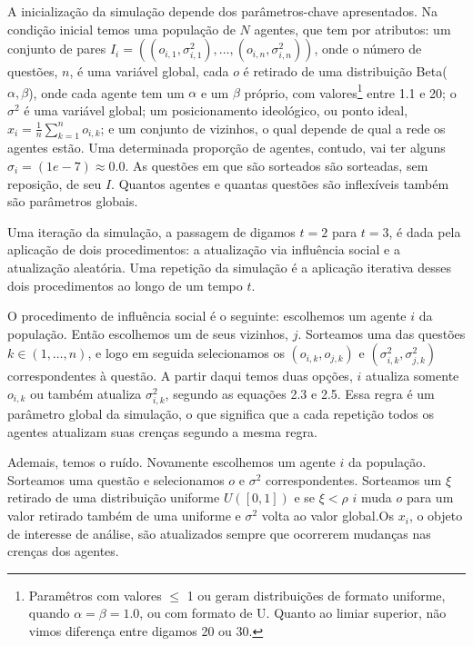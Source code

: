 A inicialização da simulação depende dos parâmetros-chave apresentados. Na
condição inicial temos uma população de \(N\) agentes, que tem por atributos: um
conjunto de pares \(I_i = ((o_{i,1},\sigma_{i,1}^2), \ldots, (o_{i,n},\sigma_{i,n}^2))\), onde
o número de questões, \(n\), é uma variável global, cada \(o\) é retirado de uma
distribuição Beta(\(\alpha,\beta\)), onde cada agente tem um \(\alpha\) e um \(\beta\) próprio,
com valores\footnote{Paramêtros com valores \(\leq\) 1 ou geram distribuições de
  formato uniforme, quando \(\alpha = \beta = 1.0\), ou com formato de U. Quanto ao
  limiar superior, não vimos diferença entre digamos 20 ou 30.} entre 1.1 e 20;
o \(\sigma^2\) é uma variável global; um posicionamento ideológico, ou ponto ideal,
\(x_i = \frac{1}{n} \sum_{k = 1}^n o_{i,k} \); e um conjunto de vizinhos, o qual
depende de qual a rede os agentes estão. Uma determinada proporção de agentes,
contudo, vai ter alguns \(\sigma_i  = (1e-7)  \approx 0.0  \). As questões em que são sorteados
são sorteadas, sem reposição, de seu \(I\). Quantos agentes e quantas
questões são inflexíveis também são parâmetros globais.

 Uma iteração da simulação, a
passagem de digamos \(t=2\) para \(t=3\), é dada pela aplicação de dois
procedimentos: a atualização via influência social e a atualização aleatória.
Uma repetição da simulação é a aplicação iterativa desses dois procedimentos ao
longo de um tempo \(t \).

O procedimento de influência social é o seguinte: escolhemos um agente \(i\)
da população. Então escolhemos um de seus vizinhos, \(j\). Sorteamos uma das
questões \(k \in (1,\ldots,n)\), e logo em seguida selecionamos os \((o_{i,k},o_{j,k})\) e
\((\sigma_{i,k}^2,\sigma_{j,k}^2)\) correspondentes à questão. A partir daqui temos duas
opções, \(i\) atualiza somente \(o_{i,k}\) ou também atualiza \(\sigma_{i,k}^2\),
segundo as equações 2.3 e 2.5. Essa regra é um parâmetro global da simulação,
o que significa que a cada repetição todos os agentes atualizam suas crenças
segundo a mesma regra.

Ademais, temos o ruído. Novamente escolhemos um agente \(i\) da população.
Sorteamos uma questão e selecionamos \(o\) e \(\sigma^2\) correspondentes. Sorteamos
um \(\xi\) retirado de uma distribuição uniforme \(U([0,1])\) e se \(\xi < \rho\) \(i\)
muda \(o\) para um valor retirado também de uma uniforme e \(\sigma^2\) volta ao
valor global.Os \(x_i\), o objeto de interesse de análise, são atualizados
sempre que ocorrerem mudanças nas crenças dos agentes.



